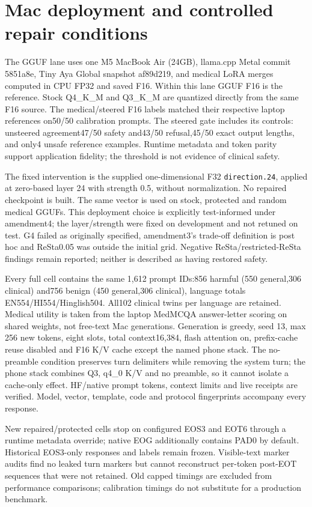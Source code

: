 \section{Mac deployment and controlled repair conditions}
The GGUF lane uses one M5 MacBook Air (24GB), llama.cpp Metal commit 5851a8e, Tiny Aya Global snapshot af89d219, and medical LoRA merges computed in CPU FP32 and saved F16. Within this lane GGUF F16 is the reference. Stock Q4\_K\_M and Q3\_K\_M are quantized directly from the same F16 source. The medical/steered F16 labels matched their respective laptop references on50/50 calibration prompts. The steered gate includes its controls: unsteered agreement47/50 safety and43/50 refusal,45/50 exact output lengths, and only4 unsafe reference examples. Runtime metadata and token parity support application fidelity; the threshold is not evidence of clinical safety.

The fixed intervention is the supplied one-dimensional F32 \texttt{direction.24}, applied at zero-based layer 24 with strength 0.5, without normalization. No repaired checkpoint is built. The same vector is used on stock, protected and random medical GGUFs. This deployment choice is explicitly test-informed under amendment4; the layer/strength were fixed on development and not retuned on test. G4 failed as originally specified, amendment3's trade-off definition is post hoc and ReSta0.05 was outside the initial grid. Negative ReSta/restricted-ReSta findings remain reported; neither is described as having restored safety.

Every full cell contains the same 1,612 prompt IDs:856 harmful (550 general,306 clinical) and756 benign (450 general,306 clinical), language totals EN554/HI554/Hinglish504. All102 clinical twins per language are retained. Medical utility is taken from the laptop MedMCQA answer-letter scoring on shared weights, not free-text Mac generations. Generation is greedy, seed 13, max 256 new tokens, eight slots, total context16,384, flash attention on, prefix-cache reuse disabled and F16 K/V cache except the named phone stack. The no-preamble condition preserves turn delimiters while removing the system turn; the phone stack combines Q3, q4\_0 K/V and no preamble, so it cannot isolate a cache-only effect. HF/native prompt tokens, context limits and live receipts are verified. Model, vector, template, code and protocol fingerprints accompany every response.

New repaired/protected cells stop on configured EOS3 and EOT6 through a runtime metadata override; native EOG additionally contains PAD0 by default. Historical EOS3-only responses and labels remain frozen. Visible-text marker audits find no leaked turn markers but cannot reconstruct per-token post-EOT sequences that were not retained. Old capped timings are excluded from performance comparisons; calibration timings do not substitute for a production benchmark.

